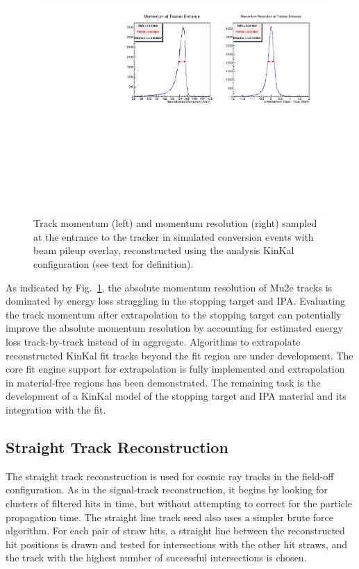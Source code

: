\begin{figure}[tbp]
 \centering
 \includegraphics[width=\textwidth]{figures/KKMom.pdf}%
 \caption{Track momentum (left) and momentum resolution (right) sampled at the entrance to the tracker in simulated conversion events with beam pileup overlay, reconstructed using the analysis KinKal configuration (see text for definition).
 }%
 \label{fig:anatrkmom}
\end{figure}

As indicated by Fig.~\ref{fig:anatrkmom}, the absolute momentum resolution of Mu2e tracks is dominated by energy loss straggling in the stopping target and IPA. Evaluating the track momentum after extrapolation to the stopping target can potentially improve the absolute momentum resolution by accounting for estimated energy loss track-by-track instead of in aggregate. Algorithms to extrapolate reconstructed KinKal fit tracks beyond the fit region are under development. The core fit engine support for extrapolation is fully implemented and extrapolation in material-free regions has been demonstrated. The remaining task is the development of a KinKal model of the stopping target and IPA material and its integration with the fit.

\subsection{Straight Track Reconstruction}

The straight track reconstruction is used for cosmic ray tracks in the field-off configuration. As in the signal-track reconstruction, it begins by looking for clusters of filtered hits in time, but without attempting to correct for the particle propagation time. The straight line track seed also uses a simpler brute force algorithm. For each pair of straw hits, a straight line between the reconstructed hit positions is drawn and tested for intersections with the other hit straws, and the track with the highest number of successful intersections is chosen.

